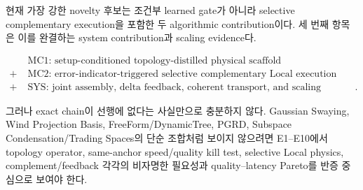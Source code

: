 \documentclass[11pt,a4paper]{article}
\begin{document}
현재 가장 강한 novelty 후보는 조건부 learned gate가 아니라
selective complementary execution을 포함한 두 algorithmic contribution이다.
세 번째 항목은 이를 완결하는 system contribution과 scaling evidence다.

\begin{equation}
\boxed{
\begin{aligned}
&\text{MC1: setup-conditioned topology-distilled physical scaffold}\\
+\;&\text{MC2: error-indicator-triggered selective complementary Local execution}\\
+\;&\text{SYS: joint assembly, delta feedback, coherent transport, and scaling evidence}.
\end{aligned}
}
\end{equation}

그러나 exact chain이 선행에 없다는 사실만으로 충분하지 않다.
Gaussian Swaying, Wind Projection Basis, FreeForm/DynamicTree,
PGRD, Subspace Condensation/Trading Spaces의 단순 조합처럼 보이지 않으려면
E1--E10에서 topology operator, same-anchor speed/quality kill test,
selective Local physics, complement/feedback 각각의 비자명한 필요성과
quality--latency Pareto를 반증 중심으로 보여야 한다.

\begingroup
\sloppy


\endgroup
\end{document}
